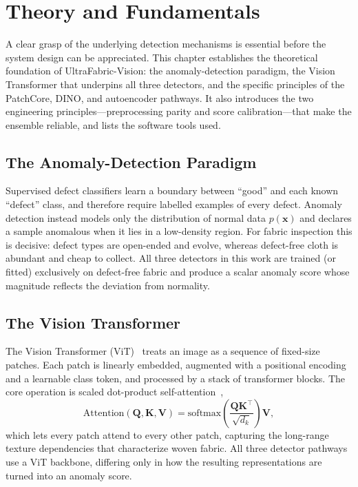 \chapter{Theory and Fundamentals}

A clear grasp of the underlying detection mechanisms is essential before the system design can be appreciated. This chapter establishes the theoretical foundation of UltraFabric-Vision: the anomaly-detection paradigm, the Vision Transformer that underpins all three detectors, and the specific principles of the PatchCore, DINO, and autoencoder pathways. It also introduces the two engineering principles---preprocessing parity and score calibration---that make the ensemble reliable, and lists the software tools used.

\section{The Anomaly-Detection Paradigm}

Supervised defect classifiers learn a boundary between ``good'' and each known ``defect'' class, and therefore require labelled examples of every defect. Anomaly detection instead models only the distribution of normal data $p(\mathbf{x})$ and declares a sample anomalous when it lies in a low-density region. For fabric inspection this is decisive: defect types are open-ended and evolve, whereas defect-free cloth is abundant and cheap to collect. All three detectors in this work are trained (or fitted) exclusively on defect-free fabric and produce a scalar anomaly score whose magnitude reflects the deviation from normality.

\section{The Vision Transformer}

The Vision Transformer (ViT)~\cite{dosovitskiy2021vit} treats an image as a sequence of fixed-size patches. Each patch is linearly embedded, augmented with a positional encoding and a learnable class token, and processed by a stack of transformer blocks. The core operation is scaled dot-product self-attention~\cite{vaswani2017attention},
\[
\text{Attention}(\mathbf{Q},\mathbf{K},\mathbf{V}) = \text{softmax}\!\left(\frac{\mathbf{Q}\mathbf{K}^\top}{\sqrt{d_k}}\right)\mathbf{V},
\]
which lets every patch attend to every other patch, capturing the long-range texture dependencies that characterize woven fabric. All three detector pathways use a ViT backbone, differing only in how the resulting representations are turned into an anomaly score.

